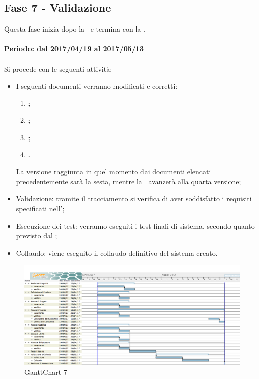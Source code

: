 \documentclass[../PianoDiProgetto.tex]{subfiles}
\begin{document}
	\subsection{Fase 7 - Validazione}
	Questa fase inizia dopo la \revisionediqualifica\ e termina con la \revisionediaccettazione.
	\\
	\\
	\textbf{Periodo: dal 2017/04/19 al 2017/05/13}
	\\
	\\
	Si procede con le seguenti attività:
	\begin{itemize}
		\item I seguenti documenti verranno modificati e corretti:
			\begin{enumerate}
				\item \normediprogetto;
				\item \analisideirequisiti;
				\item \pianodiqualifica;
				\item \pianodiprogetto.
			\end{enumerate}
		La versione raggiunta in quel momento dai documenti elencati precedentemente sarà la sesta, mentre la \ avanzerà alla quarta versione;
		\item Validazione: tramite il tracciamento si verifica di aver soddisfatto i requisiti specificati nell'\analisideirequisiti;
		\item Esecuzione dei test: verranno eseguiti i test finali di sistema, secondo quanto previsto dal \pianodiqualifica;
		\item Collaudo: viene eseguito il collaudo definitivo del sistema creato.
	\end{itemize}
	
	\begin{figure}[!h]
		\centering
		\includegraphics[width=\textwidth]{Pianificazione/Immagini/GanttChart07.png}
		\caption{GanttChart 7}
	\end{figure}	
	
\end{document}
